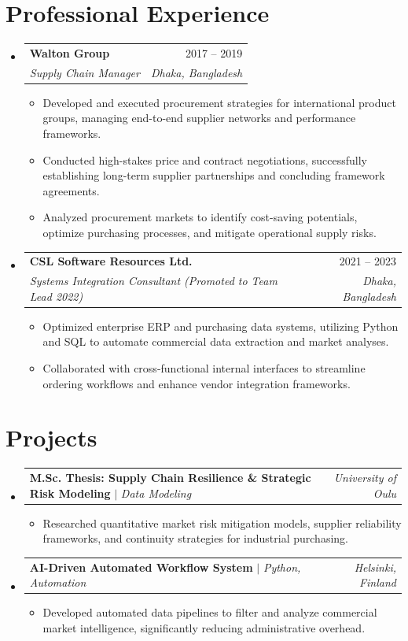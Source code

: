\documentclass[a4paper,11pt]{article}
\makeatletter
\newcommand{\resumeItem}[1]{
  \item\small{{#1}}
}
\newcommand{\resumeSubheading}[4]{
  \vspace{-2pt}\item
    \begin{tabular*}{0.97\textwidth}[t]{l@{\extracolsep{\fill}}r}
      \textbf{#1} & \small #2 \\
      \textit{\small#3} & \textit{\small #4} \\
    \end{tabular*}\vspace{-5pt}
}
\newcommand{\resumeProjectHeading}[2]{
    \item
    \begin{tabular*}{0.97\textwidth}{l@{\extracolsep{\fill}}r}
      \small#1 & \textit{\small #2} \\
    \end{tabular*}\vspace{-5pt}
}
\newcommand{\resumeSubHeadingListStart}{\begin{itemize}[leftmargin=0.15in, label={}]}
\newcommand{\resumeSubHeadingListEnd}{\end{itemize}\vspace{-5pt}}
\newcommand{\resumeItemListStart}{
  \begin{itemize}[leftmargin=0.2in, itemsep=0pt, parsep=0pt, topsep=1pt]
}
\newcommand{\resumeItemListEnd}{\end{itemize}\vspace{-2pt}}
\makeatother
\begin{document}
\vspace{-6pt}

\section{Professional Experience}
\resumeSubHeadingListStart
\resumeSubheading
  {Walton Group}{2017 -- 2019}
  {Supply Chain Manager}{Dhaka, Bangladesh}
  \resumeItemListStart
    \resumeItem{Developed and executed procurement strategies for international product groups, managing end-to-end supplier networks and performance frameworks.}
    \resumeItem{Conducted high-stakes price and contract negotiations, successfully establishing long-term supplier partnerships and concluding framework agreements.}
    \resumeItem{Analyzed procurement markets to identify cost-saving potentials, optimize purchasing processes, and mitigate operational supply risks.}
  \resumeItemListEnd

\resumeSubheading
  {CSL Software Resources Ltd.}{2021 -- 2023}
  {Systems Integration Consultant (Promoted to Team Lead 2022)}{Dhaka, Bangladesh}
  \resumeItemListStart
    \resumeItem{Optimized enterprise ERP and purchasing data systems, utilizing Python and SQL to automate commercial data extraction and market analyses.}
    \resumeItem{Collaborated with cross-functional internal interfaces to streamline ordering workflows and enhance vendor integration frameworks.}
  \resumeItemListEnd
\resumeSubHeadingListEnd

\vspace{-4pt}

\section{Projects}
\resumeSubHeadingListStart
    \resumeProjectHeading
      {\textbf{M.Sc. Thesis: Supply Chain Resilience \& Strategic Risk Modeling} $\vert{}$ \emph{Data Modeling}}{University of Oulu}
      \resumeItemListStart
        \resumeItem{Researched quantitative market risk mitigation models, supplier reliability frameworks, and continuity strategies for industrial purchasing.}
      \resumeItemListEnd

    \resumeProjectHeading
      {\textbf{AI-Driven Automated Workflow System} $\vert{}$ \emph{Python, Automation}}{Helsinki, Finland}
      \resumeItemListStart
        \resumeItem{Developed automated data pipelines to filter and analyze commercial market intelligence, significantly reducing administrative overhead.}
      \resumeItemListEnd
\resumeSubHeadingListEnd
\end{document}
